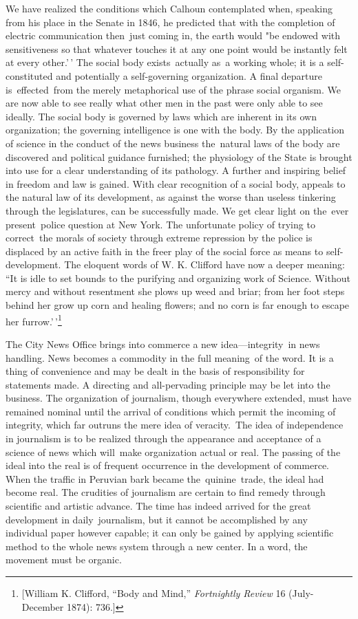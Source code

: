 \documentclass[twoside,symmetric,nobib,justified]{tufte-book}
\begin{document}
We have realized the conditions which Calhoun contemplated when,
speaking from his place in the Senate in 1846, he predicted that with
the completion of electric communication then~just coming in, the earth
would "be endowed with sensitiveness so that whatever touches it at any
one point would be instantly felt at every other.'\,' The social body
exists~actually as~a working whole; it is a self-constituted and
potentially a self-governing organization. A final departure
is~effected~from the merely metaphorical use of the phrase social
organism. We are now able to see really what other men in the past were
only able to see ideally. The social body is governed by laws which are
inherent in its own organization; the governing intelligence is one with
the body. By the application of science in the conduct of the news
business the~natural laws of the body are discovered and political
guidance furnished; the physiology of the State is brought into use for
a clear understanding of its pathology. A further and inspiring belief
in freedom and law is gained. With clear recognition of a social body,
appeals to the natural law of its development, as against the worse than
useless tinkering through the legislatures, can be successfully made. We
get clear light on the~ever present~police question at New York. The
unfortunate policy of trying to correct~the morals of society through
extreme repression by the police is displaced by an active faith in the
freer play of the social force as means to self-development. The
eloquent words of W. K. Clifford have now a deeper meaning: ``It is idle
to set bounds to the purifying and organizing work of Science. Without
mercy and without resentment she plows up weed and briar; from her foot
steps behind her grow up corn and healing flowers; and no corn is far
enough to escape her furrow.'\,'\footnote{{[}William K. Clifford, ``Body
  and Mind,'' \emph{Fortnightly Review} 16 (July-December 1874): 736.{]}}~

The City News Office brings into commerce a new idea---integrity~in news
handling. News becomes a commodity in the full meaning~of the word. It
is a thing of convenience and may be dealt in the basis of
responsibility for statements made. A directing and all-pervading
principle may be let into the business. The organization of journalism,
though everywhere extended, must have remained nominal until the arrival
of conditions which permit the incoming of integrity, which far outruns
the mere idea of veracity.~The idea of independence in journalism is to
be realized through the appearance and acceptance of a science of news
which will~make organization actual or real. The passing of the ideal
into the real is of frequent occurrence in the development of commerce.
When the traffic in Peruvian bark became the~quinine~trade, the ideal
had become real. The crudities of journalism are certain to find remedy
through scientific and artistic advance. The time has indeed arrived for
the great development in daily~journalism, but it cannot be accomplished
by any individual paper however capable; it can only be gained by
applying scientific method to the whole news system through a new
center. In a word, the movement must be organic. ~
\end{document}
